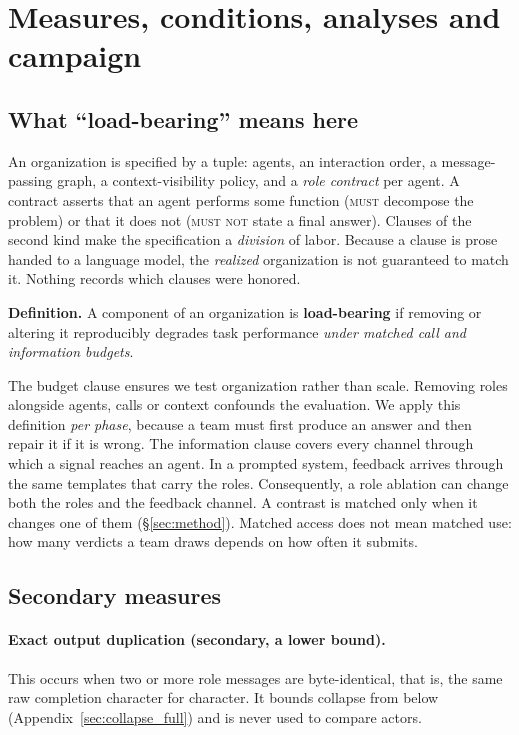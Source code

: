 \appendix



\section{Measures, conditions, analyses and campaign}
\label{app:details}

\subsection{What ``load-bearing'' means here}
\label{app:loadbearing}

An organization is specified by a tuple: agents, an interaction order, a
message-passing graph, a context-visibility policy, and a \emph{role
contract} per agent. A contract asserts that an agent performs some function
(\textsc{must} decompose the problem) or that it does not (\textsc{must not}
state a final answer). Clauses of the second kind make the specification a
\emph{division} of labor. Because a clause is prose handed to a language
model, the \emph{realized} organization is not guaranteed to match it.
Nothing records which clauses were honored.

\textbf{Definition.} A component of an organization is \textbf{load-bearing}
if removing or altering it reproducibly degrades task performance
\emph{under matched call and information budgets}.

The budget clause ensures we test organization rather than scale. Removing
roles alongside agents, calls or context confounds the evaluation. We apply
this definition \emph{per phase}, because a team must first produce an
answer and then repair it if it is wrong. The information clause covers
every channel through which a signal reaches an agent. In a prompted system,
feedback arrives through the same templates that carry the roles.
Consequently, a role ablation can change both the roles and the feedback
channel. A contrast is matched only when it changes one of them
(\S\ref{sec:method}). Matched access does not mean matched use: how many
verdicts a team draws depends on how often it submits.

\subsection{Secondary measures}
\label{app:measures}

\paragraph{Exact output duplication (secondary, a lower bound).} This occurs
when two or more role messages are byte-identical, that is, the same raw
completion character for character. It
bounds collapse from below (Appendix~\ref{sec:collapse_full}) and is never used to compare actors.

